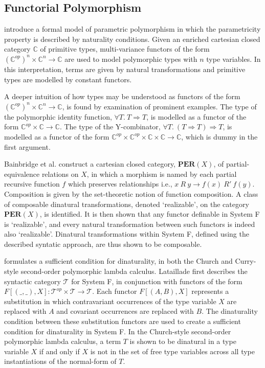 \documentclass[../../Dissertation.tex]{subfiles}
\begin{document}
\subsection{Functorial Polymorphism}\label{sec:functorial}
 introduce a formal model of parametric polymorphism in which the parametricity property is described by naturality conditions. Given an enriched cartesian closed category $\mathbb{C}$ of primitive types, multi-variance functors of the form $(\mathbb{C}^{op})^n \times \mathbb{C}^n \rightarrow \mathbb{C}$ are used to model polymorphic types with $n$ type variables. In this interpretation, terms are given by natural transformations and primitive types are modelled by constant functors.
\par
A deeper intuition of how types may be understood as functors of the form $(\mathbb{C}^{op})^n \times \mathbb{C}^n \rightarrow \mathbb{C}$, is found by examination of prominent examples. The type of the polymorphic identity function, $\forall T.\ T \Rightarrow T$, is modelled as a functor of the form $\mathbb{C}^{op} \times \mathbb{C} \rightarrow \mathbb{C}$. The type of the Y-combinator, $\forall T.\ (T \Rightarrow T) \Rightarrow T$, is modelled as a functor of the form $\mathbb{C}^{op} \times \mathbb{C}^{op} \times \mathbb{C} \times \mathbb{C} \rightarrow \mathbb{C}$, which is dummy in the first argument.
\par
Bainbridge et al. construct a cartesian closed category, $\mathbf{PER}(X)$, of partial-equivalence relations on $X$, in which a morphism is named by each partial recursive function $f$ which preserves relationships i.e., $x\ R\ y \rightarrow f(x)\ R'\ f(y)$. Composition is given by the set-theoretic notion of function composition. A class of composable dinatural transformations, denoted `realizable', on the category $\mathbf{PER}(X)$, is identified. It is then shown that any functor definable in System F is `realizable', and every natural transformation between such functors is indeed also `realizable'. Dinatural transformations within System F, defined using the described syntatic approach, are thus shown to be composable.
\par
{} formulates a sufficient condition for dinaturality, in both the Church and Curry-style second-order polymorphic lambda calculus. Lataillade first describes the syntactic category $\mathcal{T}$ for System F, in conjunction with
functors of the form $F[(\_,\_),X] : \mathcal{T}^{op} \times \mathcal{T} \rightarrow \mathcal{T}$. Each functor $F[(A,B),X]$ represents a substitution in which contravariant occurrences of the type variable $X$ are replaced with $A$ and covariant occurrences are replaced with $B$. The dinaturality condition between these substitution functors are used to create a sufficient condition for dinaturality in System F. In the Church-style second-order polymorphic lambda calculus, a term $T$ is shown to be dinatural in a type variable $X$ if and only if $X$ is not in the set of free type variables across all type instantiations of the normal-form of $T$.
\end{document}
